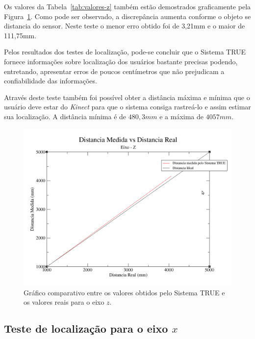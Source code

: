 	Os valores da Tabela~\ref{tab:valores-z} também estão demostrados graficamente
	pela Figura~\ref{fig:grafico-z}. Como pode ser observado, a discrepância
	aumenta conforme o objeto se distancia do sensor. Neste teste o menor erro
	obtido foi de 3,21mm e o maior de 111,75mm.
	
	Pelos resultados dos testes de localização, pode-se concluir que o
	Sistema TRUE fornece informações sobre localização dos usuários bastante
	precisas podendo, entretando, apresentar erros de poucos centímetros que não
	prejudicam a confiabilidade das informações.

	Através deste teste também foi possível obter a distância máxima e mínima que o
	usuário deve estar do \textit{Kinect} para que o sistema consiga rastreá-lo e
	assim estimar sua localização. A distância mínima é de $\displaystyle 480,3mm$
	e a máxima de $\displaystyle 4057mm$.

	\begin{figure}[H]
		\begin{center}
			\includegraphics[scale=0.4]{figuras/5.Testes/grafico-eixo-z.png}
		\end{center}
		\caption{Gráfico comparativo entre os valores obtidos pelo Sistema TRUE e os
		valores reais para o eixo $\displaystyle z$.}
		\label{fig:grafico-z}
	\end{figure}

\subsection{Teste de localização para o eixo $\displaystyle x$}

